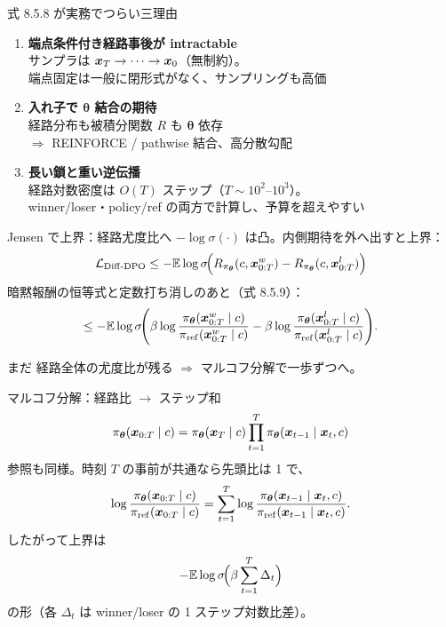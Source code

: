 \asmain
\begin{frame}{式 8.5.8 が実務でつらい三理由}
    \begin{enumerate}
        \item \textbf{端点条件付き経路事後が intractable}\\
        サンプラは $\bm{x}_T\to\cdots\to\bm{x}_0$（無制約）。\\
        端点固定は一般に閉形式がなく、サンプリングも高価
        \item \textbf{入れ子で $\bm{\theta}$ 結合の期待}\\
        経路分布も被積分関数 $R$ も $\bm{\theta}$ 依存\\
        $\Rightarrow$ REINFORCE / pathwise 結合、高分散勾配
        \item \textbf{長い鎖と重い逆伝播}\\
        経路対数密度は $O(T)$ ステップ（$T\sim 10^2$--$10^3$）。\\
        winner/loser・policy/ref の両方で計算し、予算を超えやすい
    \end{enumerate}
\end{frame}
\asmain
\begin{frame}{Jensen で上界：経路尤度比へ}
    $-\log\sigma(\cdot)$ は凸。内側期待を外へ出すと上界：
    \[
        \mathcal{L}_{\mathrm{Diff\text{-}DPO}}
        \le
        -\mathbb{E}
        \log\sigma\!\Bigl(
        R_{\pi_{\bm{\theta}}}(c,\bm{x}_{0:T}^w)
        -
        R_{\pi_{\bm{\theta}}}(c,\bm{x}_{0:T}^l)
        \Bigr)
    \]
    暗黙報酬の恒等式と定数打ち消しのあと（式 8.5.9）：
    \[
        \le
        -\mathbb{E}
        \log\sigma\!\Biggl(
        \beta\log\frac{\pi_{\bm{\theta}}(\bm{x}_{0:T}^w\mid c)}{\pi_{\mathrm{ref}}(\bm{x}_{0:T}^w\mid c)}
        -
        \beta\log\frac{\pi_{\bm{\theta}}(\bm{x}_{0:T}^l\mid c)}{\pi_{\mathrm{ref}}(\bm{x}_{0:T}^l\mid c)}
        \Biggr).
    \]
    \begin{alertblock}{まだ}
        経路全体の尤度比が残る $\Rightarrow$ マルコフ分解で一歩ずつへ。
    \end{alertblock}
\end{frame}
\asmain
\begin{frame}{マルコフ分解：経路比 $\to$ ステップ和}
    \[
        \pi_{\bm{\theta}}(\bm{x}_{0:T}\mid c)
        =
        \pi_{\bm{\theta}}(\bm{x}_T\mid c)
        \prod_{t=1}^{T}
        \pi_{\bm{\theta}}(\bm{x}_{t-1}\mid\bm{x}_t,c)
    \]
    参照も同様。時刻 $T$ の事前が共通なら先頭比は 1 で、
    \[
        \log\frac{\pi_{\bm{\theta}}(\bm{x}_{0:T}\mid c)}{\pi_{\mathrm{ref}}(\bm{x}_{0:T}\mid c)}
        =
        \sum_{t=1}^{T}
        \log\frac{\pi_{\bm{\theta}}(\bm{x}_{t-1}\mid\bm{x}_t,c)}{\pi_{\mathrm{ref}}(\bm{x}_{t-1}\mid\bm{x}_t,c)}.
    \]
    したがって上界は
    \[
        -\mathbb{E}
        \log\sigma\!\Bigl(
        \beta\sum_{t=1}^{T}\Delta_t
        \Bigr)
    \]
    の形（各 $\Delta_t$ は winner/loser の 1 ステップ対数比差）。
\end{frame}
